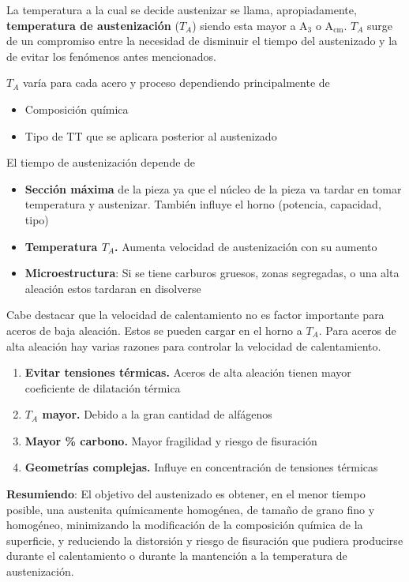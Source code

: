 \documentclass{article}
\newcommand{\Athree}{A\ensuremath{_{3}}}
\newcommand{\Acm}{A\ensuremath{_{\mathrm{cm}}}}
\begin{document}
La temperatura a la cual se decide austenizar se llama, apropiadamente, \textbf{temperatura de austenización} ($T_A$) siendo esta mayor a \Athree{} o \Acm{}. $T_A$ surge de un compromiso entre la necesidad de disminuir el tiempo del austenizado y la de evitar los fenómenos antes mencionados. 

$T_A$ varía para cada acero y proceso dependiendo principalmente de
\begin{itemize}
    \item Composición química
    \item Tipo de TT que se aplicara posterior al austenizado
\end{itemize}

El tiempo de austenización depende de
\begin{itemize}
    \item \textbf{Sección máxima} de la pieza ya que el núcleo de la pieza va tardar en tomar temperatura y austenizar. También influye el horno (potencia, capacidad, tipo)
    \item \textbf{Temperatura $T_A$.} Aumenta velocidad de austenización con su aumento
    \item \textbf{Microestructura}: Si se tiene carburos gruesos, zonas segregadas, o una alta aleación estos tardaran en disolverse
\end{itemize}

Cabe destacar que la velocidad de calentamiento no es factor importante para aceros de baja aleación. Estos se pueden cargar en el horno a $T_A$. Para aceros de alta aleación hay varias razones para controlar la velocidad de calentamiento.
\begin{enumerate}
    \item \textbf{Evitar tensiones térmicas.} Aceros de alta aleación tienen mayor coeficiente de dilatación térmica
    \item \textbf{$T_A$ mayor.} Debido a la gran cantidad de alfágenos
    \item \textbf{Mayor \% carbono.} Mayor fragilidad y riesgo de fisuración
    \item \textbf{Geometrías complejas.} Influye en concentración de tensiones térmicas
\end{enumerate}

{\bf Resumiendo}: El objetivo del austenizado es obtener, en el menor tiempo posible, una austenita químicamente homogénea, de tamaño de grano fino y homogéneo, minimizando la modificación de la composición química de la superficie, y reduciendo la distorsión y riesgo de fisuración que pudiera producirse durante el calentamiento o durante la mantención a la temperatura de austenización. 
\end{document}
